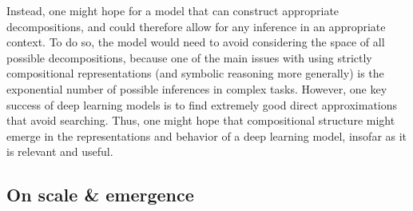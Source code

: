 Instead, one might hope for a model that can construct appropriate decompositions, and could therefore allow for any inference in an appropriate context. To do so, the model would need to avoid considering the space of all possible decompositions, because one of the main issues with using strictly compositional representations (and symbolic reasoning more generally) is the exponential number of possible inferences in complex tasks. However, one key success of deep learning models is to find extremely good direct approximations that avoid searching. Thus, one might hope that compositional structure might emerge in the representations and behavior of a deep learning model, insofar as it is relevant and useful.\par 

\subsection{On scale \& emergence}

